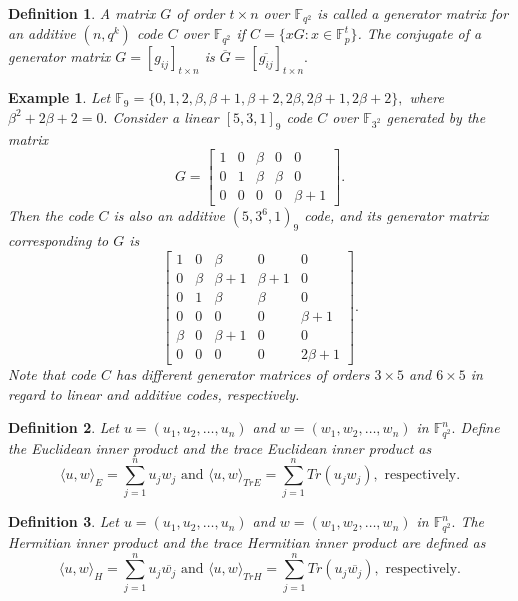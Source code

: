 \documentclass[sn-mathphys-num]{sn-jnl}%
\theoremstyle{thmstyleone}%
\theoremstyle{thmstyletwo}%
\newtheorem{example}{Example}%
\theoremstyle{thmstylethree}%
\newtheorem{definition}{Definition}%
\begin{document}
\begin{definition}
	A matrix $G$ of order $t\times n$ over $\mathbb{F}_{q^2}$  is called a generator matrix for an additive $(n,q^{k})$ code $C$ over $\mathbb{F}_{q^2}$ if $C=\{xG : x\in \mathbb{F}_p^{t}\}$.  The conjugate of a generator matrix $G=[g_{ij}]_{t\times n} $  is $\overline{G}=[\overline{g_{ij}}]_{t\times n}.$
\end{definition}

\begin{example}
	Let $\mathbb{F}_{9}=\{0,1,2,\beta,\beta +1,\beta +2,2\beta,2\beta +1,2\beta+2\},$ where $\beta^2+2\beta+2=0.$ Consider a linear $[5,3,1]_9$ code $C$ over $\mathbb{F}_{3^2}$ generated by the matrix 
	$$G=\begin{bmatrix}
		1 & 0 &\beta &0 &0\\
		0& 1&\beta &\beta &0\\
		0&0&0&0&\beta+1
	\end{bmatrix}.$$
	Then the code $C$ is also an additive $(5,3^6,1)_9$ code, and its generator  matrix corresponding to $G$ is
	$$\begin{bmatrix}
		1 & 0 &\beta &0 &0\\
		0&\beta &\beta+1&\beta+1&0\\
		0& 1&\beta &\beta &0\\
		0&0&0&0&\beta+1\\
		\beta &0&\beta+1&0&0\\
		0&0&0&0&2\beta+1
	\end{bmatrix}.$$
	Note that code $C$ has different  generator matrices of orders $3\times 5$ and $6\times 5$ in regard to linear and additive codes, respectively.
\end{example}
\begin{definition}
	Let $u=(u_1,u_2,\dots,u_n)$ and $w=(w_1,w_2,\dots,w_n)$ in $\mathbb{F}_{q^2}^n.$ Define the \textit{Euclidean inner product} and the \textit{trace Euclidean inner product} as 
	$$\langle u ,w\rangle_{E}=\sum_{j=1}^n u_jw_j \text{\ and\ } \langle u ,w\rangle_{TrE}=\sum_{j=1}^n Tr(u_jw_j),\text{\ respectively}.$$
\end{definition}
\begin{definition}
	Let $u=(u_1,u_2,\dots,u_n)$ and $w=(w_1,w_2,\dots,w_n)$ in $\mathbb{F}_{q^2}^n.$ The  \textit{Hermitian inner product} and the \textit{trace Hermitian inner product} are defined as 
	$$\langle u ,w\rangle_{H}=\sum_{j=1}^n u_j\overline{w_j}  \text{ and } \langle u ,w\rangle_{TrH}=\sum_{j=1}^n Tr(u_j\overline{w_j}), \text{ respectively}.$$
\end{definition}    
\end{document}
